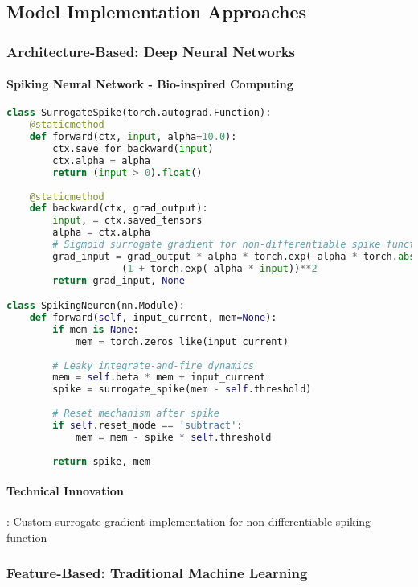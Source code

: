 \documentclass[11pt,a4paper]{article}
\begin{document}
\subsection{Model Implementation Approaches}

\subsubsection{Architecture-Based: Deep Neural Networks}

\paragraph{Spiking Neural Network - Bio-inspired Computing}
\begin{lstlisting}[language=Python, caption=SNN Technical Implementation]
class SurrogateSpike(torch.autograd.Function):
    @staticmethod
    def forward(ctx, input, alpha=10.0):
        ctx.save_for_backward(input)
        ctx.alpha = alpha
        return (input > 0).float()
    
    @staticmethod
    def backward(ctx, grad_output):
        input, = ctx.saved_tensors
        alpha = ctx.alpha
        # Sigmoid surrogate gradient for non-differentiable spike function
        grad_input = grad_output * alpha * torch.exp(-alpha * torch.abs(input)) / \
                    (1 + torch.exp(-alpha * input))**2
        return grad_input, None

class SpikingNeuron(nn.Module):
    def forward(self, input_current, mem=None):
        if mem is None:
            mem = torch.zeros_like(input_current)
        
        # Leaky integrate-and-fire dynamics
        mem = self.beta * mem + input_current
        spike = surrogate_spike(mem - self.threshold)
        
        # Reset mechanism after spike
        if self.reset_mode == 'subtract':
            mem = mem - spike * self.threshold
        
        return spike, mem
\end{lstlisting}

\paragraph{Technical Innovation}: Custom surrogate gradient implementation for non-differentiable spiking function

\subsubsection{Feature-Based: Traditional Machine Learning}
\end{document}
